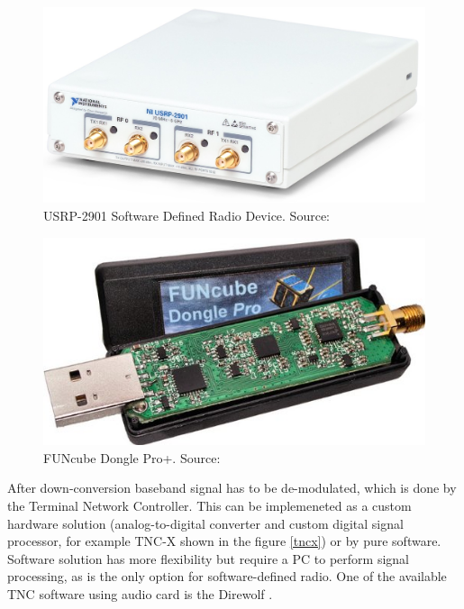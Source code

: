 \begin{minipage}{\linewidth}
    \centering
    \begin{minipage}{0.45\linewidth}
        \begin{figure}[H]
            \centering
            \includegraphics[width=0.3\paperwidth]{img/2/ni_2901.png}
            \caption{USRP-2901 Software Defined Radio Device. Source: \cite{ni_2901}}
            \label{ni_2901}
        \end{figure}
    \end{minipage}
    \hspace{0.05\linewidth}
    \begin{minipage}{0.45\linewidth}
        \begin{figure}[H]
            \centering
            \includegraphics[width=0.3\paperwidth]{img/2/funcube.jpg}
            \caption{FUNcube Dongle Pro+. Source: \cite{funcube}}
            \label{funcube}
        \end{figure}
    \end{minipage}
\end{minipage}

After down-conversion baseband signal has to be de-modulated, which is done by the Terminal Network Controller. This can be implemeneted as a custom hardware solution (analog-to-digital converter and custom digital signal processor, for example TNC-X shown in the figure \ref{tncx}) or by pure software. Software solution has more flexibility but require a PC to perform signal processing, as is the only option for software-defined radio. One of the available TNC software using audio card is the Direwolf \cite{direwolf}.

